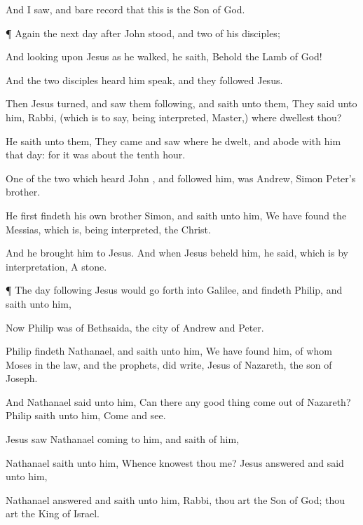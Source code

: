 {And I
saw,
and bare
record
that
this
is the
Son of
God.


\par }{\PP {}¶
Again the next
day
after
John
stood,
and
two
of
his
disciples;

And
looking upon
Jesus as he
walked, he
saith,
Behold the
Lamb of
God!

And the
two
disciples
heard
him
speak,
and they
followed
Jesus.

Then
Jesus
turned,
and
saw
them
following, and
saith unto
them,
{} They
said unto
him,
Rabbi, (which is to
say, being
interpreted,
Master,)
where dwellest
thou?

He
saith unto
them,
{} They
came
and
saw
where he
dwelt,
and
abode
with
him
that
day:
for it
was
about the
tenth
hour.

One
of the
two
which
heard
John
{},
and
followed
him,
was
Andrew,
Simon
Peter’s
brother.

He
first
findeth his
own
brother
Simon,
and
saith unto
him, We have
found the
Messias,
which
is, being
interpreted, the
Christ.

And he
brought
him
to
Jesus.
And
when
Jesus
beheld
him, he
said,
{}
which is by
interpretation, A
stone.


\par }{\PP {}¶ The day
following
Jesus
would go
forth
into
Galilee,
and
findeth
Philip,
and
saith unto
him,
{}

Now
Philip
was
of
Bethsaida, the
city of
Andrew
and
Peter.

Philip
findeth
Nathanael,
and
saith unto
him, We have
found him, of
whom
Moses
in the
law,
and the
prophets, did
write,
Jesus
of
Nazareth, the
son of
Joseph.

And
Nathanael
said unto
him, Can
there
any
good
thing
come out
of
Nazareth?
Philip
saith unto
him,
Come
and
see.

Jesus
saw
Nathanael
coming
to
him,
and
saith
of
him,
{}

Nathanael
saith unto
him,
Whence knowest
thou
me?
Jesus
answered
and
said unto
him,
{}

Nathanael
answered
and
saith unto
him,
Rabbi,
thou
art the
Son of
God;
thou
art the
King of
Israel.

}

